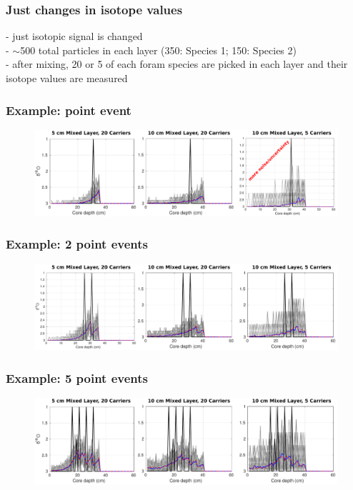 \documentclass{beamer}
\begin{document}
\begin{frame}
\frametitle{Just changes in isotope values}
- just isotopic signal is changed\\[1.5ex]
- $\sim$500 total particles in each layer (350: Species 1; 150: Species 2)\\[1.5ex]
- after mixing, 20 or 5 of each foram species are picked in each layer and their isotope values are measured
\end{frame}

\begin{frame}
\frametitle{Example: point event}
\begin{figure}[hbtp]
\hspace*{-0.8cm}\includegraphics[width=1.1\textwidth]{figures/JustABU_pointevent1.pdf}%
\end{figure}
\end{frame}

\begin{frame}
\frametitle{Example: 2 point events}
\begin{figure}[hbtp]
\hspace*{-0.8cm}\includegraphics[width=1.1\textwidth]{figures/JustABU_pointevent2.pdf}%
\end{figure}
\end{frame}

\begin{frame}
\frametitle{Example: 5 point events}
\begin{figure}[hbtp]
\hspace*{-0.8cm}\includegraphics[width=1.1\textwidth]{figures/JustABU_pointevent5.pdf}%
\end{figure}
\end{frame}
\end{document}
